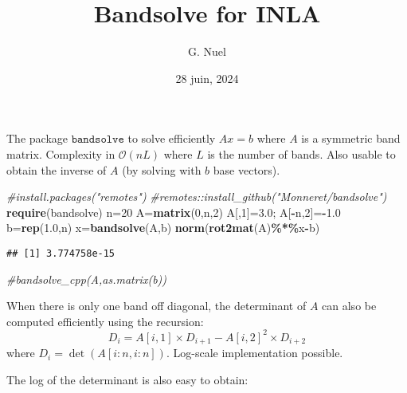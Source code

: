 \documentclass[
]{article}
\title{Bandsolve for INLA}
\author{G. Nuel}
\date{28 juin, 2024}
\newenvironment{Shaded}{\begin{snugshade}}{\end{snugshade}}
\newcommand{\CommentTok}[1]{\textcolor[rgb]{0.56,0.35,0.01}{\textit{#1}}}
\newcommand{\DecValTok}[1]{\textcolor[rgb]{0.00,0.00,0.81}{#1}}
\newcommand{\FloatTok}[1]{\textcolor[rgb]{0.00,0.00,0.81}{#1}}
\newcommand{\FunctionTok}[1]{\textcolor[rgb]{0.13,0.29,0.53}{\textbf{#1}}}
\newcommand{\NormalTok}[1]{#1}
\newcommand{\OtherTok}[1]{\textcolor[rgb]{0.56,0.35,0.01}{#1}}
\newcommand{\SpecialCharTok}[1]{\textcolor[rgb]{0.81,0.36,0.00}{\textbf{#1}}}
\begin{document}
\maketitle

The package \(\texttt{bandsolve}\) to solve efficiently \(Ax=b\) where
\(A\) is a symmetric band matrix. Complexity in \(\mathcal{O}(n L)\)
where \(L\) is the number of bands. Also usable to obtain the inverse of
\(A\) (by solving with \(b\) base vectors).

\begin{Shaded}
\begin{Highlighting}[]
\CommentTok{\#install.packages("remotes")}
\CommentTok{\#remotes::install\_github("Monneret/bandsolve")}
\FunctionTok{require}\NormalTok{(bandsolve)}
\NormalTok{n}\OtherTok{=}\DecValTok{20}
\NormalTok{A}\OtherTok{=}\FunctionTok{matrix}\NormalTok{(}\DecValTok{0}\NormalTok{,n,}\DecValTok{2}\NormalTok{)}
\NormalTok{A[,}\DecValTok{1}\NormalTok{]}\OtherTok{=}\FloatTok{3.0}\NormalTok{; A[}\SpecialCharTok{{-}}\NormalTok{n,}\DecValTok{2}\NormalTok{]}\OtherTok{=}\SpecialCharTok{{-}}\FloatTok{1.0}
\NormalTok{b}\OtherTok{=}\FunctionTok{rep}\NormalTok{(}\FloatTok{1.0}\NormalTok{,n)}
\NormalTok{x}\OtherTok{=}\FunctionTok{bandsolve}\NormalTok{(A,b)}
\FunctionTok{norm}\NormalTok{(}\FunctionTok{rot2mat}\NormalTok{(A)}\SpecialCharTok{\%*\%}\NormalTok{x}\SpecialCharTok{{-}}\NormalTok{b)}
\end{Highlighting}
\end{Shaded}

\begin{verbatim}
## [1] 3.774758e-15
\end{verbatim}

\begin{Shaded}
\begin{Highlighting}[]
\CommentTok{\#bandsolve\_cpp(A,as.matrix(b))}
\end{Highlighting}
\end{Shaded}

When there is only one band off diagonal, the determinant of \(A\) can
also be computed efficiently using the recursion: \[
D_i=A[i,1]\times  D_{i+1}-A[i,2]^2 \times D_{i+2}
\] where \(D_i=\det(A[i:n,i:n])\). Log-scale implementation possible.

The log of the determinant is also easy to obtain:
\end{document}
